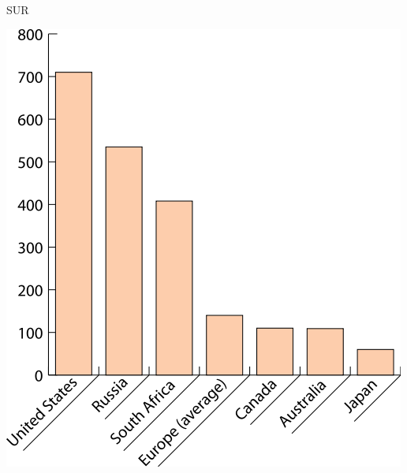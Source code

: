 \documentclass[print,Draft]{faosyb}
\begin{document}
\clearspread
\begin{chart}{S}{UR}
\caption{Incarceration ratest across countries: and UR chart}
\label{chart:incarceration}
\includegraphics[width=\chartwidth,height=\chartheight]{incarceration}  
\end{chart}
\onecolumn

\end{document}
